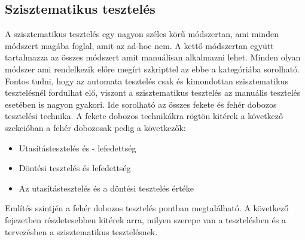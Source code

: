 \subsection{Szisztematikus tesztelés} A szisztematikus tesztelés egy nagyon széles körű módszertan, ami minden módszert magába foglal, amit az ad-hoc nem. A kettő módszertan együtt tartalmazza az összes módszert amit manuálisan alkalmazni lehet. Minden olyan módszer ami rendelkezik előre megírt szkripttel az ebbe a kategóriába sorolható. Fontos tudni, hogy az automata tesztelés csak és kimondottan szisztematikus tesztelésnél fordulhat elő, viszont a szisztematikus tesztelés az manuális tesztelés esetében is nagyon gyakori. Ide sorolható az összes fekete és fehér dobozos tesztelési technika. A fekete dobozos technikákra rögtön kitérek a következő szekcióban a fehér dobozosak pedig a következők:
\begin{itemize}
\item Utasítástesztelés és - lefedettség
\item Döntési tesztelés és lefedettség
\item Az utasítástesztelés és a döntési tesztelés értéke
\end{itemize}
Említés szintjén a fehér dobozos tesztelés  pontban megtalálható.
\label{tab:sziszt}
A következő fejezetben részletesebben kitérek arra, milyen szerepe van a tesztelésben és a tervezésben a szisztematikus tesztelésnek.

